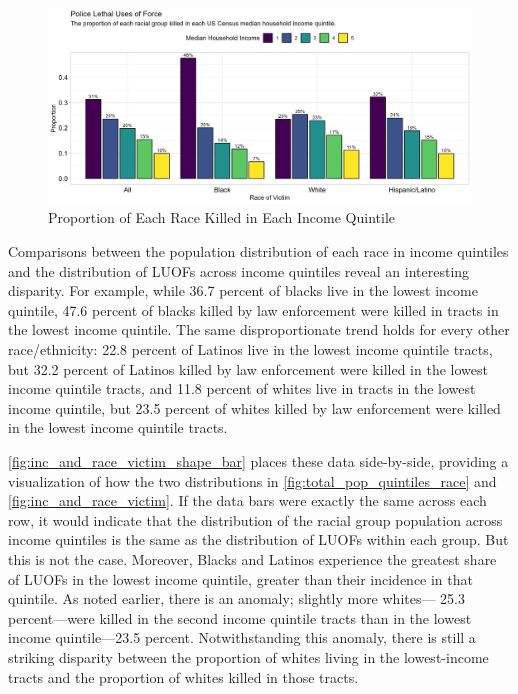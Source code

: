 \documentclass[12pt]{article}
\begin{document}
\begin{figure}[H]
  \centering
  \includegraphics[width=\linewidth]{images/inc_and_race_victim}
  \captionsetup{justification=centering, singlelinecheck=false, margin=2cm}
  \caption{Proportion of Each Race Killed in Each Income Quintile}
  \label{fig:inc_and_race_victim}
\end{figure}


Comparisons between the population distribution of each race in income quintiles and the distribution of LUOFs across income quintiles reveal an interesting disparity. For example, while 36.7 percent of blacks live in the lowest income quintile, 47.6 percent of blacks killed by law enforcement were killed in tracts in the lowest income quintile. The same disproportionate trend holds for every other race/ethnicity: 22.8 percent of Latinos live in the lowest income quintile tracts, but 32.2 percent of Latinos killed by law enforcement were killed in the lowest income quintile tracts, and 11.8 percent of whites live in tracts in the lowest income quintile, but 23.5 percent of whites killed by law enforcement were killed in the lowest income quintile tracts.

\autoref{fig:inc_and_race_victim_shape_bar} places these data side-by-side, providing a visualization of how the two distributions in \autoref{fig:total_pop_quintiles_race} and \autoref{fig:inc_and_race_victim}. If the data bars were exactly the same across each row, it would indicate that the distribution of the racial group population across income quintiles is the same as the distribution of LUOFs within each group. But this is not the case. Moreover, Blacks and Latinos experience the greatest share of LUOFs in the lowest income quintile, greater than their incidence in that quintile. As noted earlier, there is an anomaly; slightly more whites— 25.3 percent—were killed in the second income quintile tracts than in the lowest income quintile—23.5 percent. Notwithstanding this anomaly, there is still a striking disparity between the proportion of whites living in the lowest-income tracts and the proportion of whites killed in those tracts.
\end{document}

